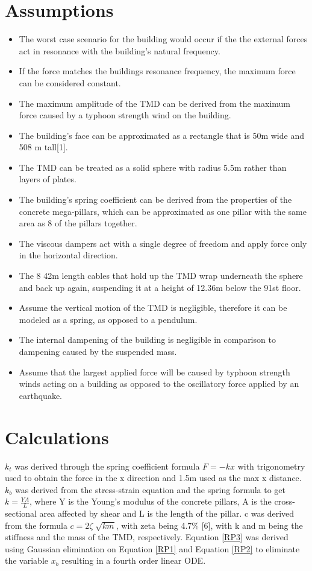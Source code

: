 \documentclass[12pt,twoside,letterpaper]{article}
\begin{document}
\section*{Assumptions}
\begin{itemize}
	\item The worst case scenario for the building would occur if the the external forces act in resonance with the building's natural frequency. 
    \item If the force matches the buildings resonance frequency, the maximum force can be considered constant. 
    \item The maximum amplitude of the TMD can be derived from the maximum force caused by a typhoon strength wind on the building.
	\item The building's face can be approximated as a rectangle that is 50m wide and 508 m tall[1].
	\item The TMD can be treated as a solid sphere with radius 5.5m rather than layers of plates.
    \item The building's spring coefficient can be derived from the properties of the concrete mega-pillars, which can be approximated as one pillar with the same area as 8 of the pillars together.
    \item The viscous dampers act with a single degree of freedom and apply force only in the horizontal direction.
    \item The 8 42m length cables that hold up the TMD wrap underneath the sphere and back up again, suspending it at a height of 12.36m below the 91st floor.
    \item Assume the vertical motion of the TMD is negligible, therefore it can be modeled as a spring, as opposed to a pendulum.
    \item The internal dampening of the building is negligible in comparison to dampening caused by the suspended mass.  
    \item Assume that the largest applied force will be caused by typhoon strength winds acting on a building as opposed to the oscillatory force applied by an earthquake.
\end{itemize}


\section*{Calculations}
$k_t$ was derived through the spring coefficient formula $ F = -kx $ with trigonometry used to obtain the force in the x direction and 1.5m used as the max x distance. $k_b$ was derived from the stress-strain equation and the spring formula to get $k = \frac{YA}{L}$, where Y is the Young's modulus of the concrete pillars, A is the cross-sectional area affected by shear and L is the length of the pillar. c was derived from the formula $c = 2\zeta\sqrt[]{km}$, with zeta being 4.7$\%$ [6], with k and m being the stiffness and the mass of the TMD, respectively.
\newline
Equation \ref{RP3} was derived using Gaussian elimination on Equation \ref{RP1} and Equation \ref{RP2} to eliminate the variable $x_b$ resulting in a fourth order linear ODE.
\end{document}
